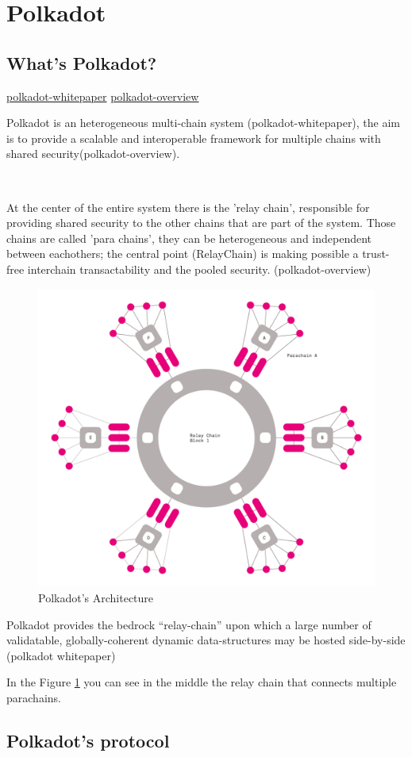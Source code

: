 \documentclass[../main.tex]{subfiles}
\begin{document}
\section{Polkadot}
\subsection{What's Polkadot?}
\href{https://assets.polkadot.network/Polkadot-whitepaper.pdf}{polkadot-whitepaper}
\href{https://arxiv.org/pdf/2005.13456.pdf}{polkadot-overview}

Polkadot is an heterogeneous multi-chain system (polkadot-whitepaper), the aim is to provide a scalable and interoperable framework for multiple chains with shared security(polkadot-overview).

\

At the center of the entire system there is the 'relay chain', responsible for providing shared security to the other chains that are part of the system. Those chains are called 'para chains', they can be heterogeneous and independent between eachothers; the central point (RelayChain) is making possible a trust-free interchain transactability and the pooled security. (polkadot-overview)

\begin{figure}
  \centering
  \includegraphics[width=0.4\linewidth]{polkadot_architecture.png}
  \caption{Polkadot's Architecture}
  \label{fig:polkadot_arch}
\end{figure}

Polkadot provides the bedrock “relay-chain” upon which a large number of validatable, globally-coherent dynamic data-structures may be hosted side-by-side (polkadot whitepaper)

In the Figure \ref{fig:polkadot_arch} you can see in the middle the relay chain that connects multiple parachains.

\subsection{Polkadot's protocol}
\end{document}
